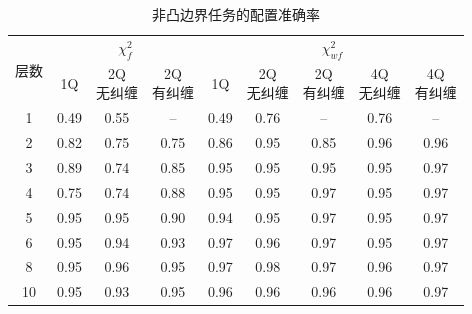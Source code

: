 \documentclass[a4paper]{ctexart}
\begin{document}
\begin{table}[H]
    \centering
    \caption{非凸边界任务的配置准确率}
    \label{tab:appendix-results-nonconv}
    \renewcommand{\arraystretch}{1.2}
    \begin{tabular}{@{}c*{8}{c}@{}}
        \toprule
        \multirow{2}{*}{层数} & \multicolumn{3}{c}{$\chi_f^2$} & \multicolumn{5}{c}{$\chi_{wf}^2$}                                           \\
        \cmidrule(lr){2-4}\cmidrule(lr){5-9}
                            & 1Q                             & \shortstack{2Q                                                              \\无纠缠} & \shortstack{2Q\\有纠缠} & 1Q & \shortstack{2Q\\无纠缠} & \shortstack{2Q\\有纠缠} & \shortstack{4Q\\无纠缠} & \shortstack{4Q\\有纠缠} \\
        \midrule
        1                   & 0.49                           & 0.55                              & --   & 0.49 & 0.76 & --   & 0.76 & --   \\
        2                   & 0.82                           & 0.75                              & 0.75 & 0.86 & 0.95 & 0.85 & 0.96 & 0.96 \\
        3                   & 0.89                           & 0.74                              & 0.85 & 0.95 & 0.95 & 0.95 & 0.95 & 0.97 \\
        4                   & 0.75                           & 0.74                              & 0.88 & 0.95 & 0.95 & 0.97 & 0.95 & 0.97 \\
        5                   & 0.95                           & 0.95                              & 0.90 & 0.94 & 0.95 & 0.97 & 0.95 & 0.97 \\
        6                   & 0.95                           & 0.94                              & 0.93 & 0.97 & 0.96 & 0.97 & 0.95 & 0.97 \\
        8                   & 0.95                           & 0.96                              & 0.95 & 0.97 & 0.98 & 0.97 & 0.96 & 0.97 \\
        10                  & 0.95                           & 0.93                              & 0.95 & 0.96 & 0.96 & 0.96 & 0.96 & 0.97 \\
        \bottomrule
    \end{tabular}
\end{table}
\end{document}
